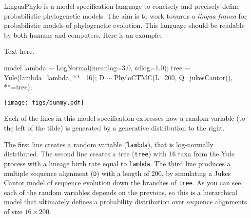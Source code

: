 \documentclass[oneside]{article}
\begin{document}
LinguaPhylo is a model specification language to concisely and
precisely define probabilistic phylogenetic models.
The aim is to work
towards a {\it lingua franca} for probabilistic models of phylogenetic
evolution.
This language should be readable by both humans and
computers.
Here is an example: 

\begin{tcolorbox}[breakable, width=\textwidth, colback=gray!10, boxrule=0pt,
  title=Box 1: A simple molecular phylogenetic model, fonttitle=\bfseries]
  \small 
  Text here.

  \hspace{-1cm}
  \begin{minipage}[b]{0.7\textwidth}
    {\singlespacing
      \begin{lphylisting}
        model {
          lambda $\sim$ LogNormal(meanlog=3.0, sdlog=1.0);
          tree $\sim$ Yule(lambda=lambda, *\color{grayargs}{n}*=16);
          D $\sim$ PhyloCTMC(L=200, Q=jukesCantor(),
          *\color{grayargs}{tree}*=tree);
        }
      \end{lphylisting}
    }
  \end{minipage}
  \begin{minipage}[b]{0.3\textwidth}
    \texttt{[image: figs/dummy.pdf]}
  \end{minipage}


\end{tcolorbox}
Each of the lines in this model specification expresses how a random
variable (to the left of the tilde) is generated by a generative
distribution to the right. 

The first line creates a random variable (\texttt{lambda}), that is
log-normally distributed.
The second line creates a tree (\texttt{tree}) with 16 taxa from the
Yule process with a lineage birth rate equal to \texttt{lambda}.
The third line produces a multiple sequence alignment (\texttt{D})
with a length of 200, by simulating a Jukes Cantor model of sequence
evolution down the branches of  \texttt{tree}.
As you can see, each of the random variables depends on the previous,
so this is a hierarchical model that ultimately defines a probability
distribution over sequence alignments of size $16 \times 200$.
\end{document}
